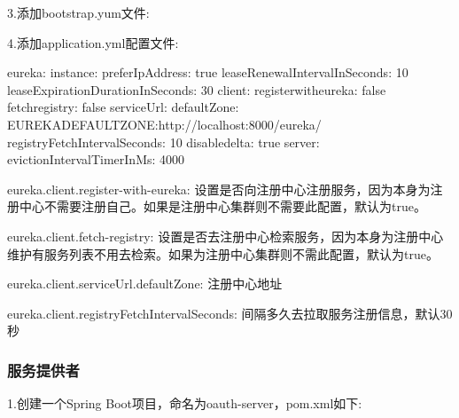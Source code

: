 \documentclass[letterpaper,10pt,english]{sphinxmanual}
\begin{document}
3.添加bootstrap.yum文件:

\begin{sphinxVerbatim}[commandchars=\\\{\}]
   
     
\end{sphinxVerbatim}

4.添加application.yml配置文件:

\begin{sphinxVerbatim}[commandchars=\\\{\}]
eureka:
  instance:
    preferIpAddress: true
    leaseRenewalIntervalInSeconds: 10
    leaseExpirationDurationInSeconds: 30
  client:
    register\PYGZhy{}with\PYGZhy{}eureka: false
    fetch\PYGZhy{}registry: false
    serviceUrl:
      defaultZone: \PYGZdl{}\PYGZob{}EUREKA\PYGZus{}DEFAULT\PYGZus{}ZONE:http://localhost:8000/eureka/\PYGZcb{}
    registryFetchIntervalSeconds: 10
    disable\PYGZhy{}delta: true
  server:
    evictionIntervalTimerInMs: 4000
\end{sphinxVerbatim}

eureka.client.register-with-eureka: 设置是否向注册中心注册服务，因为本身为注册中心不需要注册自己。如果是注册中心集群则不需要此配置，默认为true。

eureka.client.fetch-registry: 设置是否去注册中心检索服务，因为本身为注册中心维护有服务列表不用去检索。如果为注册中心集群则不需此配置，默认为true。

eureka.client.serviceUrl.defaultZone: 注册中心地址

eureka.client.registryFetchIntervalSeconds: 间隔多久去拉取服务注册信息，默认30秒


\subsubsection{服务提供者}
\label{\detokenize{01.spring-cloud/02.eureka/eureka_02:id2}}
1.创建一个Spring Boot项目，命名为oauth-server，pom.xml如下:
\end{document}
